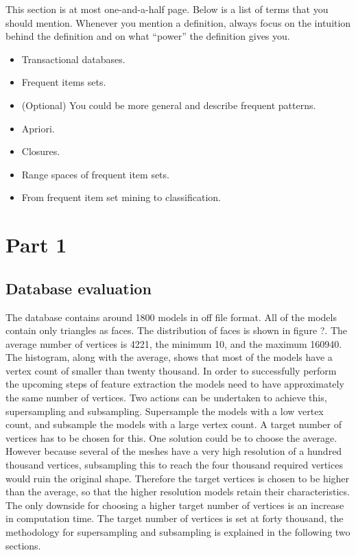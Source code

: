 \documentclass{bigdata}
\begin{document}
This section is at most one-and-a-half page. Below is a list of terms that you should mention. Whenever you mention a definition, always focus on the intuition behind the definition and on what ``power'' the definition gives you.

\begin{itemize}
    \item Transactional databases.
    \item Frequent items sets.
    \item (Optional) You could be more general and describe frequent patterns.
    \item Apriori.
    \item Closures.
    \item Range spaces of frequent item sets.
    \item From frequent item set mining to classification.
\end{itemize}




\section{Part 1}

\subsection{Database evaluation}
The database contains around 1800 models in off file format. All of the models contain only triangles as faces. The distribution of faces is shown in figure ?. The average number of vertices is 4221, the minimum 10, and the maximum 160940. The histogram, along with the average, shows that most of the models have a vertex count of smaller than twenty thousand. In order to successfully perform the upcoming steps of feature extraction the models need to have approximately the same number of vertices. Two actions can be undertaken to achieve this, supersampling and subsampling. Supersample the models with a low vertex count, and subsample the models with a large vertex count. A target number of vertices has to be chosen for this. One solution could be to choose the average. However because several of the meshes have a very high resolution of a hundred thousand vertices, subsampling this to reach the four thousand required vertices would ruin the original shape. Therefore the target vertices is chosen to be higher than the average, so that the higher resolution models retain their characteristics. The only downside for choosing a higher target number of vertices is an increase in computation time. The target number of vertices is set at forty thousand, the methodology for supersampling and subsampling is explained in the following two sections.
\end{document}
